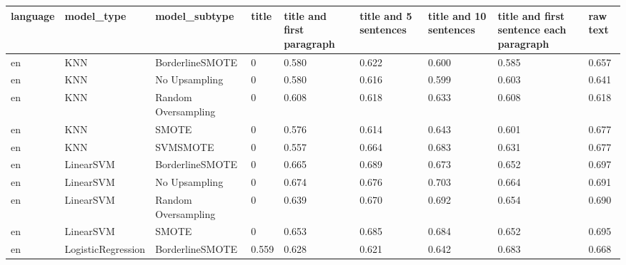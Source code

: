 \begin{tabular}{lllllllll}
\toprule
language &                   model\_type &       model\_subtype & title & title and first paragraph & title and 5 sentences & title and 10 sentences & title and first sentence each paragraph &  raw text \\
\midrule
      en &                          KNN &     BorderlineSMOTE &     0 &                     0.580 &                 0.622 &                  0.600 &                                   0.585 &     0.657 \\
      en &                          KNN &       No Upsampling &     0 &                     0.580 &                 0.616 &                  0.599 &                                   0.603 &     0.641 \\
      en &                          KNN & Random Oversampling &     0 &                     0.608 &                 0.618 &                  0.633 &                                   0.608 &     0.618 \\
      en &                          KNN &               SMOTE &     0 &                     0.576 &                 0.614 &                  0.643 &                                   0.601 &     0.677 \\
      en &                          KNN &            SVMSMOTE &     0 &                     0.557 &                 0.664 &                  0.683 &                                   0.631 &     0.677 \\
      en &                    LinearSVM &     BorderlineSMOTE &     0 &                     0.665 &                 0.689 &                  0.673 &                                   0.652 &     0.697 \\
      en &                    LinearSVM &       No Upsampling &     0 &                     0.674 &                 0.676 &                  0.703 &                                   0.664 &     0.691 \\
      en &                    LinearSVM & Random Oversampling &     0 &                     0.639 &                 0.670 &                  0.692 &                                   0.654 &     0.690 \\
      en &                    LinearSVM &               SMOTE &     0 &                     0.653 &                 0.685 &                  0.684 &                                   0.652 &     0.695 \\
      en &           LogisticRegression &     BorderlineSMOTE & 0.559 &                     0.628 &                 0.621 &                  0.642 &                                   0.683 &     0.668 \\

\end{tabular}
